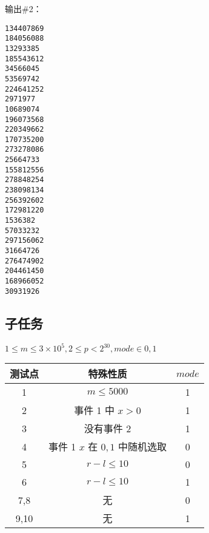输出\#2：

\begin{lstlisting}
134407869
184056088
13293385
185543612
34566045
53569742
224641252
2971977
10689074
196073568
220349662
170735200
273278086
25664733
155812556
278848254
238098134
256392602
172981220
1536382
57033232
297156062
31664726
276474902
204461450
168966052
30931926
\end{lstlisting}

\subsection*{子任务}

$1 \le m \le 3 \times 10^5, 2 \le p < 2^{30}, mode \in { 0, 1 }$

\begin{table}[htbp]
\centering
\begin{tabular}{ccc}
    \toprule
    测试点 & 特殊性质 & $mode$ \\
    \midrule
    1 & $m \le 5000$ & 1 \\
    2 & 事件 1 中 $x > 0$ & 1 \\
    3 & 没有事件 2 & 1 \\
    4 & 事件 1 $x$ 在 $0,1$ 中随机选取 & 0 \\
    5 & $r-l\le 10$ & 0 \\
    6 & $r-l\le 10$ & 1 \\
    7,8 & 无 & 0 \\
    9,10 & 无 & 1 \\
    \bottomrule
\end{tabular}
\end{table}
